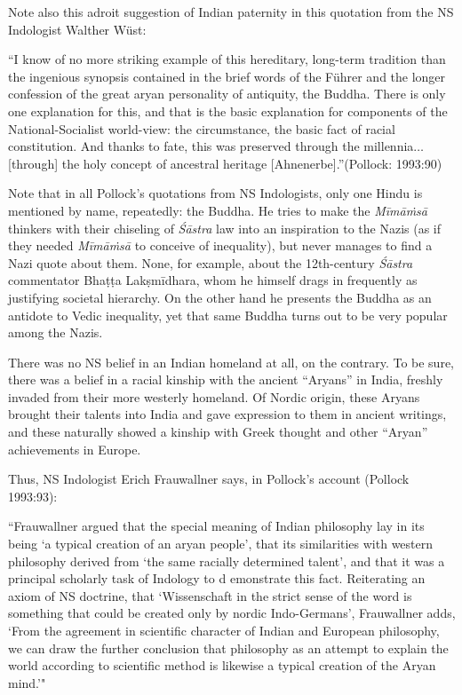 Note also this adroit suggestion of Indian paternity in this quotation from the NS Indologist Walther Wüst: 
\begin{myquote}
“I know of no more striking example of this hereditary, long-term tradition than the ingenious synopsis contained in the brief words of the Führer and the longer confession of the great aryan personality of antiquity, the Buddha. There is only one explanation for this, and that is the basic explanation for components of the National-Socialist world-view: the circumstance, the basic fact of racial constitution. And thanks to fate, this was preserved through the millennia$\ldots$ [through] the holy concept of ancestral heritage [Ahnenerbe].”\hfill (Pollock: 1993:90)
\end{myquote}

Note that in all Pollock’s quotations from NS Indologists, only one Hindu is mentioned by name, repeatedly: the Buddha. He tries to make the {\sl Mīmāṁsā} thinkers with their chiseling of {\sl Śāstra} law into an inspiration to the Nazis (as if they needed {\sl Mīmāṁsā} to conceive of inequality), but never manages to find a Nazi quote about them. None, for example, about the 12th-century {\sl Śāstra} commentator Bhaṭṭa Lakṣmīdhara, whom he himself drags in frequently as justifying societal hierarchy. On the other hand he presents the Buddha as an antidote to Vedic inequality, yet that same Buddha turns out to be very popular among the Nazis.

There was no NS belief in an Indian homeland at all, on the contrary. To be sure, there was a belief in a racial kinship with the ancient “Aryans” in India, freshly invaded from their more westerly homeland. Of Nordic origin, these Aryans brought their talents into India and gave expression to them in ancient writings, and these naturally showed a kinship with Greek thought and other “Aryan” achievements in Europe.

Thus, NS Indologist Erich Frauwallner says, in Pollock’s account (Pollock 1993:93): 
\newpage

\begin{myquote}
“Frauwallner argued that the special meaning of Indian philosophy lay in its being ‘a typical creation of an aryan people’, that its similarities with western philosophy derived from ‘the same racially determined talent’, and that it was a principal scholarly task of Indology to d emonstrate this fact. Reiterating an axiom of NS doctrine, that ‘Wissenschaft in the strict sense of the word is something that could be created only by nordic Indo-Germans’, Frauwallner adds, ‘From the agreement in scientific character of Indian and European philosophy, we can draw the further conclusion that philosophy as an attempt to explain the world according to scientific method is likewise a typical creation of the Aryan mind.’"
\end{myquote}

